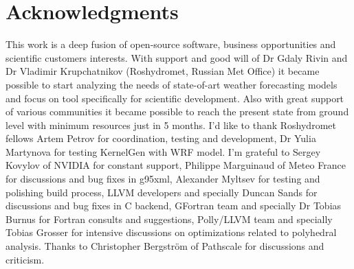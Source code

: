 \documentclass[a4,12pt]{article}
\begin{document}
\section{Acknowledgments}

This work is a deep fusion of open-source software, business opportunities and scientific customers interests. With support and good will of Dr Gdaly Rivin and Dr Vladimir Krupchatnikov (Roshydromet, Russian Met Office) it became possible to start analyzing the needs of state-of-art weather forecasting models and focus on tool specifically for scientific development. Also with great support of various communities it became possible to reach the present state from ground level with minimum resources just in 5 months. I'd like to thank Roshydromet fellows Artem Petrov for coordination, testing and development, Dr Yulia Martynova for testing KernelGen with WRF model. I'm grateful to Sergey Kovylov of NVIDIA for constant support, Philippe Marguinaud of Meteo France for discussions and bug fixes in g95xml, Alexander Myltsev for testing and polishing build process, LLVM developers and specially Duncan Sands for discussions and bug fixes in C backend, GFortran team and specially Dr Tobias Burnus for Fortran consults and suggestions, Polly/LLVM team and specially Tobias Grosser for intensive discussions on optimizations related to polyhedral analysis. Thanks to Christopher Bergström of Pathscale for discussions and criticism.
\end{document}

